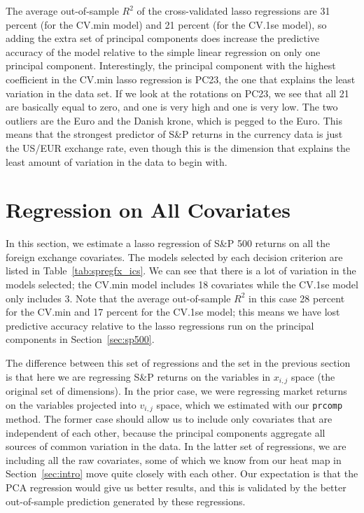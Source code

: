 \documentclass[11pt, fleqn]{article}
\begin{document}


The average out-of-sample $R^2$ of the cross-validated lasso regressions are 31 percent (for the CV.min model) and 21 percent (for the CV.1se model), so adding the extra set of principal components does increase the predictive accuracy of the model relative to the simple linear regression on only one principal component. Interestingly, the principal component with the highest coefficient in the CV.min lasso regression is PC23, the one that explains the least variation in the data set. If we look at the rotations on PC23, we see that all 21 are basically equal to zero, and one is very high and one is very low. The two outliers are the Euro and the Danish krone, which is pegged to the Euro. This means that the strongest predictor of S\&P returns in the currency data is just the US/EUR exchange rate, even though this is the dimension that explains the least amount of variation in the data to begin with.

\section{Regression on All Covariates} \label{sec:regall}

In this section, we estimate a lasso regression of S\&P 500 returns on all the foreign exchange covariates. The models selected by each decision criterion are listed in Table~\ref{tab:spregfx_ics}. We can see that there is a lot of variation in the models selected; the CV.min model includes 18 covariates while the CV.1se model only includes 3. Note that the average out-of-sample $R^2$ in this case 28 percent for the CV.min and 17 percent for the CV.1se model; this means we have lost predictive accuracy relative to the lasso regressions run on the principal components in Section~\ref{sec:sp500}. 

The difference between this set of regressions and the set in the previous section is that here we are regressing S\&P returns on the variables in $x_{i,j}$ space (the original set of dimensions). In the prior case, we were regressing market returns on the variables projected into $v_{i,j}$ space, which we estimated with our \texttt{prcomp} method. The former case should allow us to include only covariates that are independent of each other, because the principal components aggregate all sources of common variation in the data. In the latter set of regressions, we are including all the raw covariates, some of which we know from our heat map in Section~\ref{sec:intro} move quite closely with each other. Our expectation is that the PCA regression would give us better results, and this is validated by the better out-of-sample prediction generated by these regressions.
\end{document}
